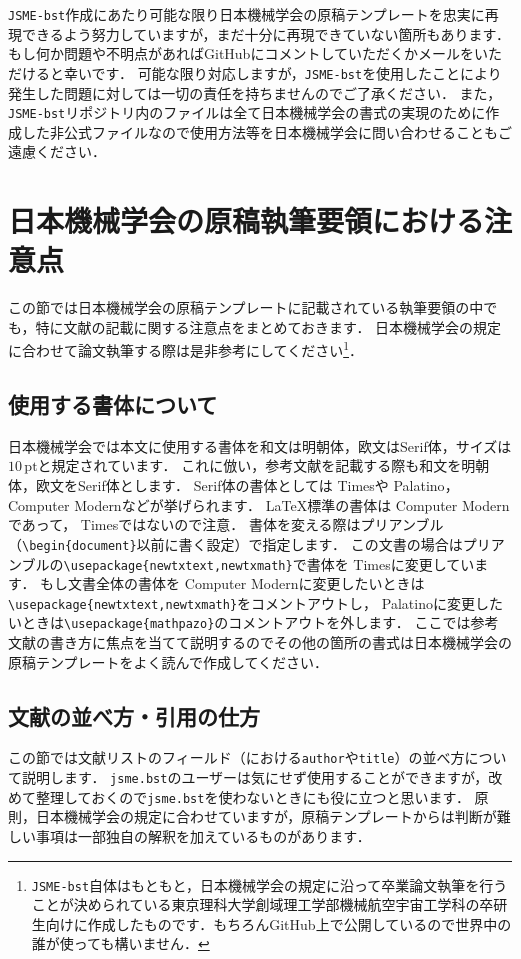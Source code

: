 \documentclass[a4paper,fleqn,uplatex,dvipdfmx]{jsarticle}
\newcommand{\jsmefile}{\texttt{jsme.bst}}
\newcommand{\JSMErepos}{\texttt{JSME-bst}}
\begin{document}
\JSMErepos 作成にあたり可能な限り日本機械学会の原稿テンプレートを忠実に再現できるよう努力していますが，まだ十分に再現できていない箇所もあります．
もし何か問題や不明点があればGitHubにコメントしていただくかメールをいただけると幸いです．
可能な限り対応しますが，\JSMErepos を使用したことにより発生した問題に対しては一切の責任を持ちませんのでご了承ください．
また，\JSMErepos リポジトリ内のファイルは全て日本機械学会の書式の実現のために作成した非公式ファイルなので使用方法等を日本機械学会に問い合わせることもご遠慮ください．


\section{日本機械学会の原稿執筆要領における注意点}
\label{sec:caution}
この節では日本機械学会の原稿テンプレートに記載されている執筆要領の中でも，特に文献の記載に関する注意点をまとめておきます．
日本機械学会の規定に合わせて論文執筆する際は是非参考にしてください\footnote{\JSMErepos 自体はもともと，日本機械学会の規定に沿って卒業論文執筆を行うことが決められている東京理科大学創域理工学部機械航空宇宙工学科の卒研生向けに作成したものです．もちろんGitHub上で公開しているので世界中の誰が使っても構いません．}．

\subsection{使用する書体について}
日本機械学会では本文に使用する書体を和文は明朝体，欧文はSerif体，サイズは$10\,\mathrm{pt}$と規定されています．
これに倣い，参考文献を記載する際も和文を明朝体，欧文をSerif体とします．
Serif体の書体としては{ Times}や{ Palatino}，{ Computer Modern}などが挙げられます．
\LaTeX{}標準の書体は{ Computer Modern}であって，{ Times}ではないので注意．
書体を変える際はプリアンブル（\verb|\begin{document}|以前に書く設定）で指定します．
この文書の場合はプリアンブルの\verb|\usepackage{newtxtext,newtxmath}|で書体を{ Times}に変更しています．
もし文書全体の書体を{ Computer Modern}に変更したいときは\verb|\usepackage{newtxtext,newtxmath}|をコメントアウトし，{ Palatino}に変更したいときは\verb|\usepackage{mathpazo}|のコメントアウトを外します．
ここでは参考文献の書き方に焦点を当てて説明するのでその他の箇所の書式は日本機械学会の原稿テンプレートをよく読んで作成してください．

\subsection{文献の並べ方・引用の仕方}
この節では文献リストのフィールド（\BibTeX{}における\verb|author|や\verb|title|）の並べ方について説明します．
\jsmefile のユーザーは気にせず使用することができますが，改めて整理しておくので\jsmefile を使わないときにも役に立つと思います．
原則，日本機械学会の規定に合わせていますが，原稿テンプレートからは判断が難しい事項は一部独自の解釈を加えているものがあります．
\end{document}
